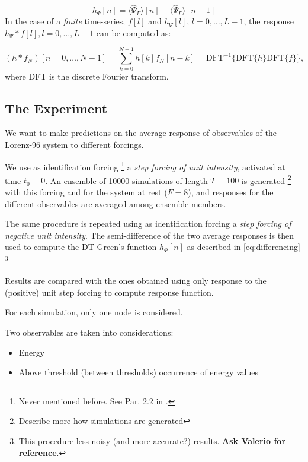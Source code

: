 \documentclass{article}
\begin{document}
\begin{equation} \label{eq:differencing}
h_{\Psi}[n]=\langle\hat{\Psi}_{\Gamma}\rangle[n]-\langle\hat{\Psi}_{\Gamma}\rangle[n-1]
\end{equation}
In the case of a \textit{finite} time-series, $f[l]$ and $h_{\Psi}[l]$, $l=0, \dots, L-1$, the response $h_{\Psi} * f[l], l=0, \dots, L-1$ can be computed as:

\begin{equation}
\left(h * f_{N}\right)[n=0, \ldots, N-1]=\sum_{k=0}^{N-1} h[k] f_{N}[n-k]=\mathrm{DFT}^{-1}\{\mathrm{DFT}\{h\} \mathrm{DFT}\{f\}\},
\end{equation}
where DFT is the discrete Fourier transform.

\subsection{The Experiment}

We want to make predictions on the average response of observables of the Lorenz-96 system to different forcings.

We use as identification forcing \footnote{Never mentioned before. See Par. 2.2 in \cite{Bodai}.\label{fn9}} a \textit{step forcing of unit intensity}, activated at time $t_0=0$. An ensemble of 10000 simulations of length $T=100$ is generated \footnote{Describe more how simulations are generated} with this forcing and for the system at rest ($F=8$), and responses for the different observables are averaged among ensemble members.

The same procedure is repeated using as identification forcing a \textit{step forcing of negative unit intensity}. The semi-difference of the two average responses is then used to compute the DT Green's function $h_{\Psi}[n]$ as described in \eqref{eq:differencing} \footnote{This procedure less noisy (and more accurate?) results. \textbf{Ask Valerio for reference}.}

Results are compared with the ones obtained using only response to the (positive) unit step forcing to compute response function.

For each simulation, only one node is considered.
 
Two observables are taken into considerations:

\begin{itemize}
	\item Energy
	\item Above threshold (between thresholds) occurrence of energy values
\end{itemize}
\end{document}
